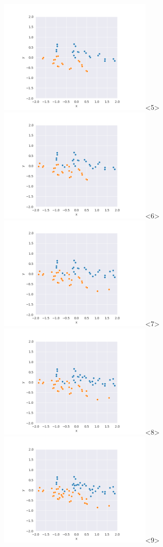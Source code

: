 \begin{frame}
  \includegraphics[width=3in]{../png/ward_stretch/ward_stretch_21.png}<5>
  \includegraphics[width=3in]{../png/ward_stretch/ward_stretch_26.png}<6>
  \includegraphics[width=3in]{../png/ward_stretch/ward_stretch_31.png}<7>
  \includegraphics[width=3in]{../png/ward_stretch/ward_stretch_36.png}<8>
  \includegraphics[width=3in]{../png/ward_stretch/ward_stretch_41.png}<9>

\end{frame}
